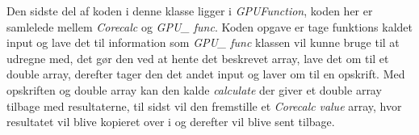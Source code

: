 Den sidste del af koden i denne klasse ligger i \textit{GPUFunction}, koden her er samlelede mellem \textit{Corecalc} og \textit{GPU\_ func}. Koden opgave er tage funktions kaldet input og lave det til information som \textit{GPU\_ func} klassen vil kunne bruge til at udregne med, det gør den ved at hente det beskrevet array, lave det om til et double array, derefter tager den det andet input og laver om til en opskrift. Med opskriften og double array kan den kalde \textit{calculate} der giver et double array tilbage med resultaterne, til sidst vil den fremstille et \textit{Corecalc} \textit{value} array, hvor resultatet vil blive kopieret over i og derefter vil blive sent tilbage.